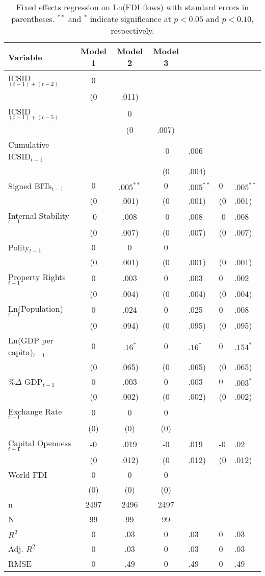 \begin{table}[ht]
\centering
{\footnotesize
\begin{tabular}{lccc}
 Variable & Model 1 & Model 2 & Model 3 \\ 
  \hline
\hline
ICSID$_{(t-1) + (t-2)}$ & 0 &  &  \\ 
   & (0&.011) &  &  \\ 
  ICSID$_{(t-1) + (t-5)}$ &  & 0 &  \\ 
   &  & (0&.007) &  \\ 
  Cumulative ICSID$_{t-1}$ &  &  & -0&.006 \\ 
   &  &  & (0&.004) \\ 
  Signed BITs$_{t-1}$ & $0$&$.005^{\ast\ast}$ & $0$&$.005^{\ast\ast}$ & $0$&$.005^{\ast\ast}$ \\ 
   & (0&.001) & (0&.001) & (0&.001) \\ 
  Internal Stability$_{t-1}$ & -0&.008 & -0&.008 & -0&.008 \\ 
   & (0&.007) & (0&.007) & (0&.007) \\ 
  Polity$_{t-1}$ & 0 & 0 & 0 \\ 
   & (0&.001) & (0&.001) & (0&.001) \\ 
  Property Rights$_{t-1}$ & 0&.003 & 0&.003 & 0&.002 \\ 
   & (0&.004) & (0&.004) & (0&.004) \\ 
  Ln(Population)$_{t-1}$ & 0&.024 & 0&.025 & 0&.008 \\ 
   & (0&.094) & (0&.095) & (0&.095) \\ 
  Ln(GDP per capita)$_{t-1}$ & $0$&$.16^{\ast}$ & $0$&$.16^{\ast}$ & $0$&$.154^{\ast}$ \\ 
   & (0&.065) & (0&.065) & (0&.065) \\ 
  \%$\Delta$ GDP$_{t-1}$ & 0&.003 & 0&.003 & $0$&$.003^{\ast}$ \\ 
   & (0&.002) & (0&.002) & (0&.002) \\ 
  Exchange Rate$_{t-1}$ & 0 & 0 & 0 \\ 
   & (0) & (0) & (0) \\ 
  Capital Openness$_{t-1}$ & -0&.019 & -0&.019 & -0&.02 \\ 
   & (0&.012) & (0&.012) & (0&.012) \\ 
  World FDI & 0 & 0 & 0 \\ 
   & (0) & (0) & (0) \\ 
   \hline
n & 2497 & 2496 & 2497 \\ 
  N & 99 & 99 & 99 \\ 
  $R^{2}$ & 0&.03 & 0&.03 & 0&.03 \\ 
  Adj. $R^{2}$ & 0&.03 & 0&.03 & 0&.03 \\ 
  RMSE & 0&.49 & 0&.49 & 0&.49 \\ 
   \hline
\hline
\end{tabular}
}
\caption{Fixed effects regression on Ln(FDI flows) with standard errors in parentheses. $^{**}$ and $^{*}$ indicate significance at $p< 0.05 $ and $p< 0.10 $, respectively.} 
\end{table}
